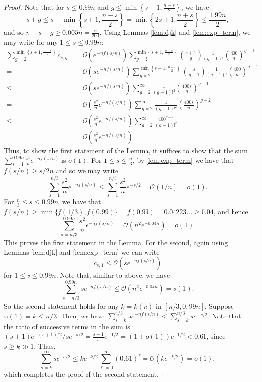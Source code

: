 \documentclass[11pt]{article}
\theoremstyle{definition}
\theoremstyle{remark}
\theoremstyle{remark}
\numberwithin{theorem}{section}
\newcommand{\bigO}{\mathcal{O}}
\begin{document}
\begin{proof}
	Note that for $s \leq 0.99n$ and $g \leq \min\left\{s+1, \frac{n-s}{2}\right\}$, we have
	$$
		s+g \leq s + \min\left\{s+1, \frac{n-s}{2} \right\} = \min\left\{2s+1, \frac{n+s}{2} \right\}\leq \frac{1.99n}{2},
	$$
	and so $n-s-g \geq 0.005n = \frac{n}{200}$. Using Lemmas \ref{lem:djk} and \ref{lem:exp_term}, we may write for any $1 \leq s \leq 0.99n$:
	\begin{align*}
            \sum_{g=2}^{\min\left\{s+1, \frac{n-s}{2}\right\}}c_{s,g} =& \bigO(e^{-nf(s/n)})\sum_{g=2}^{\min\left\{s+1, \frac{n-s}{2}\right\}}\binom{s+1}{g}\frac{1}{(g-1)!}\left(\frac{400}{n} \right)^{g-1}\\
            =&\bigO(se^{-nf(s/n)})\sum_{g=2}^{\min\left\{s+1, \frac{n-s}{2}\right\}}\binom{s}{g-1}\frac{1}{(g-1)!}\left(\frac{400}{n} \right)^{g-1}\\
            \leq& \bigO(se^{-nf(s/n)})\sum_{g=2}^{\infty}\frac{1}{(g-1)!^{2}}\left(\frac{400s}{n} \right)^{g-1}\\
            =& \bigO\left(\frac{s^{2}}{n}e^{-nf(s/n)} \right)\sum_{g=2}^{\infty}\frac{1}{(g-1)!^{2}}\left(\frac{400s}{n} \right)^{g-2}\\
            \leq & \bigO\left(\frac{s^{2}}{n}e^{-nf(s/n)} \right)\sum_{g=2}^{\infty}\frac{400^{g-2}}{(g-1)!^{2}}\\
            =&\bigO\left(\frac{s^{2}}{n}e^{-nf(s/n)} \right).
	\end{align*}
	Thus, to show the first statement of the Lemma, it suffices to show that the sum $\sum_{s=1}^{0.99n}\frac{s^{2}}{n}e^{-nf(s/n)}$ is $o(1)$. For $1 \leq s \leq \frac{n}{3}$, by \cref{lem:exp_term} we have that $f(s/n) \ge s/2n$ and so we may write
	$$
		\sum_{s=1}^{n/3}\frac{s^{2}}{n}e^{-nf(s/n)} \leq \sum_{s=1}^{n/3}\frac{s^{2}}{n}e^{-s/2} = \bigO(1/n) = o(1).
	$$
	For $\frac{n}{3} \leq s \leq 0.99n$, we have that $f(s/n) \geq \min\{f(1/3), f(0.99)\} = f(0.99) = 0.04223...\geq 0.04$, and hence 
	$$
		\sum_{s=n/3}^{0.99n}\frac{s^{2}}{n}e^{-nf(s/n)} = \bigO(n^{2}e^{-0.04n}) = o(1).
	$$
	This proves the first statement in the Lemma. For the second, again using Lemmas \ref{lem:djk} and \ref{lem:exp_term} we can write 
	$$
		c_{s,1} \leq \bigO\left(se^{-nf(s/n)} \right)
	$$
	for $1 \leq s \leq 0.99n.$ Note that, similar to above, we have 
    $$
        \sum_{s=n/3}^{0.99n}se^{-nf(s/n)} \leq \bigO(n^{2}e^{-0.04n}) = o(1).
    $$
    So the second statement holds for any $k = k(n)$ in $[n/3, 0,99n].$ Suppose $\omega(1) = k \leq n/3$. Then, we have $\sum_{s=k}^{n/3}se^{-nf(s/n)} \leq \sum_{s=k}^{n/3}se^{-s/2}$. Note that the ratio of successive terms in the sum is $(s+1)e^{-(s+1)/2}/se^{-s/2} = \frac{s+1}{s}e^{-1/2} = (1+o(1))e^{-1/2} < 0.61$, since $s \ge k \gg 1$. Thus,
    $$
        \sum_{s=k}^{\infty}se^{-s/2} \leq ke^{-k/2}\sum_{\ell = 0}^{\infty}(0.61)^{\ell} = \bigO \left( ke^{-k/2} \right) = o(1),
    $$
    which completes the proof of the second statement.
\end{proof}
\end{document}
